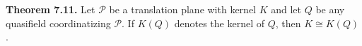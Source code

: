 \textbf{Theorem 7.11.} Let $\mathcal{P}$ be a translation plane with kernel $K$ and let $Q$ be any quasifield coordinatizing $\mathcal{P}$. If $K(Q)$ denotes the kernel of $Q$, then $K \cong K(Q)$.
